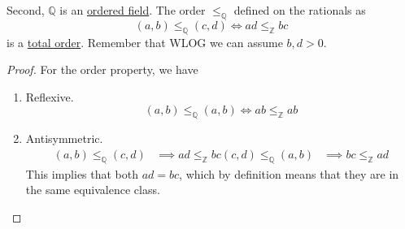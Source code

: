   \begin{theorem}
    \label{thm:ordered-field-structure}
    Second, $\mathbb{Q}$ is an \hyperref[def:ordered-field]{ordered field}. The order $\leq_{\mathbb{Q}}$ defined on the rationals as 
    \begin{equation}
      (a, b) \leq_{\mathbb{Q}} (c, d) \iff ad \leq_{\mathbb{Z}} bc
    \end{equation}
    is a \hyperref[st-def:total-order]{total order}. Remember that WLOG we can assume $b, d > 0$.  
  \end{theorem}
  \begin{proof}
    For the order property, we have 
    \begin{enumerate}
      \item Reflexive. 
      \begin{equation}
        (a, b) \leq_{\mathbb{Q}} (a, b) \iff ab \leq_{\mathbb{Z}} ab
      \end{equation} 

      \item Antisymmetric. 
      \begin{align}
        (a, b) \leq_{\mathbb{Q}} (c, d) & \implies ad \leq_{\mathbb{Z}} bc
        (c, d) \leq_{\mathbb{Q}} (a, b) & \implies bc \leq_{\mathbb{Z}} ad
      \end{align} 
      This implies that both $ad = bc$, which by definition means that they are in the same equivalence class. 


\end{enumerate}
\end{proof}
